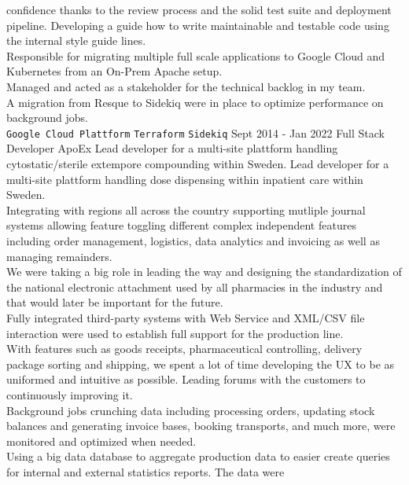 \documentclass[9pt]{template} %
\begin{document}
\begin{entrylist}
{      confidence thanks to the review process and the solid test suite and
      deployment pipeline. Developing a guide how to write maintainable
      and testable code using the internal style guide lines.\\
      Responsible for migrating multiple full scale applications to Google Cloud
      and Kubernetes from an On-Prem Apache setup.\\
      Managed and acted as a stakeholder for the technical backlog in my team.\\
      A migration from Resque to Sidekiq were in place to optimize performance
      on background jobs.\\
      \texttt{Google Cloud Plattform}\slashsep
      \texttt{Terraform}\slashsep
      \texttt{Sidekiq}
    }
  \entry
    {Sept 2014 - Jan 2022}
    {Full Stack Developer}
    {ApoEx}
    {Lead developer for a multi-site plattform handling cytostatic/sterile
      extempore compounding within Sweden.
      Lead developer for a multi-site plattform handling dose dispensing within
      inpatient care within Sweden.\\
      Integrating with regions all across the country supporting mutliple
      journal systems allowing feature toggling different complex independent
      features including order management, logistics, data analytics and
      invoicing as well as managing remainders.\\
      We were taking a big role in leading the way and designing the
      standardization of the national electronic attachment used by all
      pharmacies in the industry and that would later be important for the
      future.\\
      Fully integrated third-party systems with Web Service and XML/CSV file
      interaction were used to establish full support for the
      production line.\\
      With features such as goods receipts, pharmaceutical controlling, delivery
      package sorting and shipping, we spent a lot of time developing the UX to
      be as uniformed and intuitive as possible. Leading forums with the
      customers to continuously improving it.\\
      Background jobs crunching data including processing orders, updating stock
      balances and generating invoice bases, booking transports, and much more,
      were monitored and optimized when needed.\\
      Using a big data database to aggregate production data to easier create
      queries for internal and external statistics reports. The data were
}
\end{entrylist}
\end{document}
